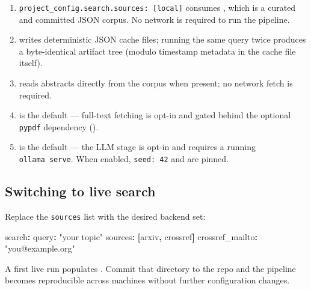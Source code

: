 \documentclass[
  english,
]{article}
\newenvironment{Shaded}{}{}
\newcommand{\AttributeTok}[1]{\textcolor[rgb]{0.49,0.56,0.16}{#1}}
\newcommand{\FunctionTok}[1]{\textcolor[rgb]{0.02,0.16,0.49}{#1}}
\newcommand{\KeywordTok}[1]{\textcolor[rgb]{0.00,0.44,0.13}{\textbf{#1}}}
\newcommand{\StringTok}[1]{\textcolor[rgb]{0.25,0.44,0.63}{#1}}
\providecommand{\tightlist}{%
  \setlength{\itemsep}{0pt}\setlength{\parskip}{0pt}}
\begin{document}
\begin{enumerate}
\def\labelenumi{\arabic{enumi}.}
\tightlist
\item
  \texttt{project\_config.search.sources:\ {[}local{]}} consumes
  , which is a curated and committed JSON
  corpus. No network is required to run the pipeline.
\item
   writes deterministic
  JSON cache files; running the same query twice produces a
  byte-identical artifact tree (modulo timestamp metadata in the cache
  file itself).
\item
   reads abstracts directly
  from the corpus when present; no network fetch is required.
\item
   is the default ---
  full-text fetching is opt-in and gated behind the optional
  \texttt{pypdf} dependency ().
\item
   is the default --- the LLM stage is
  opt-in and requires a running \texttt{ollama\ serve}. When enabled,
  \texttt{seed:\ 42} and  are pinned.
\end{enumerate}

\subsection{Switching to live search}\label{switching-to-live-search}

Replace the \texttt{sources} list with the desired backend set:

\begin{Shaded}
\begin{Highlighting}[]
\FunctionTok{search}\KeywordTok{:}
\AttributeTok{  }\FunctionTok{query}\KeywordTok{:}\AttributeTok{ }\StringTok{"your topic"}
\AttributeTok{  }\FunctionTok{sources}\KeywordTok{:}\AttributeTok{ }\KeywordTok{[}\AttributeTok{arxiv}\KeywordTok{,}\AttributeTok{ crossref}\KeywordTok{]}
\AttributeTok{  }\FunctionTok{crossref\_mailto}\KeywordTok{:}\AttributeTok{ }\StringTok{"you@example.org"}
\end{Highlighting}
\end{Shaded}

A first live run populates . Commit that
directory to the repo and the pipeline becomes reproducible across
machines without further configuration changes.
\end{document}
